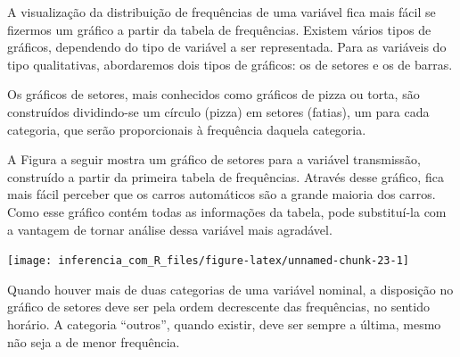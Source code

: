 \documentclass[
]{book}
\newenvironment{Shaded}{\begin{snugshade}}{\end{snugshade}}
\newcommand{\AttributeTok}[1]{\textcolor[rgb]{0.77,0.63,0.00}{#1}}
\newcommand{\DecValTok}[1]{\textcolor[rgb]{0.00,0.00,0.81}{#1}}
\newcommand{\FunctionTok}[1]{\textcolor[rgb]{0.00,0.00,0.00}{#1}}
\newcommand{\NormalTok}[1]{#1}
\newcommand{\OtherTok}[1]{\textcolor[rgb]{0.56,0.35,0.01}{#1}}
\newcommand{\SpecialCharTok}[1]{\textcolor[rgb]{0.00,0.00,0.00}{#1}}
\newcommand{\StringTok}[1]{\textcolor[rgb]{0.31,0.60,0.02}{#1}}
\begin{document}
A visualização da distribuição de frequências de uma variável fica mais fácil se fizermos um gráfico a partir da tabela de frequências. Existem vários tipos de gráficos, dependendo do tipo de variável a ser representada. Para as variáveis do tipo qualitativas, abordaremos dois tipos de gráficos: os de setores e os de barras.

Os gráficos de setores, mais conhecidos como gráficos de pizza ou torta, são construídos dividindo-se um círculo (pizza) em setores (fatias), um para cada categoria, que serão proporcionais à frequência daquela categoria.

A Figura a seguir mostra um gráfico de setores para a variável transmissão, construído a partir da primeira tabela de frequências. Através desse gráfico, fica mais fácil perceber que os carros automáticos são a grande maioria dos carros. Como esse gráfico contém todas as informações da tabela, pode substituí-la com a vantagem de tornar análise dessa variável mais agradável.

\begin{Shaded}
\end{Shaded}

\begin{center}\texttt{[image: inferencia\_com\_R\_files/figure-latex/unnamed-chunk-23-1]} \end{center}

Quando houver mais de duas categorias de uma variável nominal, a disposição no gráfico de setores deve ser pela ordem decrescente das frequências, no sentido horário. A categoria ``outros'', quando existir, deve ser sempre a última, mesmo não seja a de menor frequência.
\end{document}

